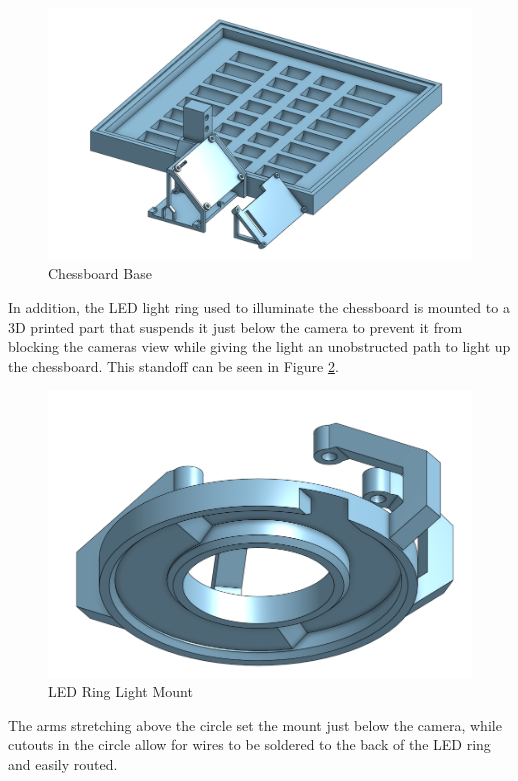 \documentclass[journal]{IEEEtran}
\begin{document}
\begin{figure}[!ht]
	\centering
	\includegraphics[width=\linewidth]{Images/BoardMount.png}
	\caption{Chessboard Base}
	\label{BoardMount}
\end{figure}

In addition, the LED light ring used to illuminate the chessboard is mounted to a 3D printed part that suspends it just below the camera to prevent it from blocking the cameras view while giving the light an unobstructed path to light up the chessboard. This standoff can be seen in Figure \ref{LEDMount}. 

\begin{figure}[!ht]
	\centering
	\includegraphics[width=\linewidth]{Images/LEDMount.png}
	\caption{LED Ring Light Mount}
	\label{LEDMount}
\end{figure}

The arms stretching above the circle set the mount just below the camera, while cutouts in the circle allow for wires to be soldered to the back of the LED ring and easily routed.
\end{document}
